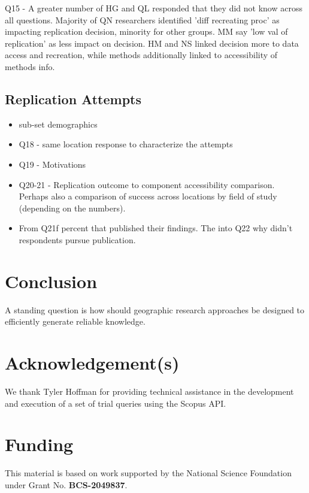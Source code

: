 \documentclass[]{interact}
\theoremstyle{plain}%
\theoremstyle{definition}
\theoremstyle{remark}
\begin{document}
Q15 - A greater number of HG and QL responded that they did not know across all questions. Majority of QN researchers identified 'diff recreating proc' as impacting replication decision, minority for other groups. MM say 'low val of replication' as less impact on decision. HM and NS linked decision more to data access and recreation, while methods additionally linked to accessibility of methods info.


\subsection*{Replication Attempts}
\begin{itemize}
    \item sub-set demographics
    \item Q18 - same location response to characterize the attempts
    \item Q19 - Motivations
    \item Q20-21 - Replication outcome to component accessibility comparison. Perhaps also a comparison of success across locations by field of study (depending on the numbers).
    \item From Q21f percent that published their findings. The into Q22 why didn't respondents pursue publication.
\end{itemize}

\section*{Conclusion}
A standing question is how should geographic research approaches be designed to efficiently generate reliable knowledge.

\theendnotes


\section*{Acknowledgement(s)}
We thank Tyler Hoffman for providing technical assistance in the development and execution of a set of trial queries using the Scopus API.

\section*{Funding}
This material is based on work supported by the National Science Foundation under Grant No. \textbf{BCS-2049837}.
\end{document}
